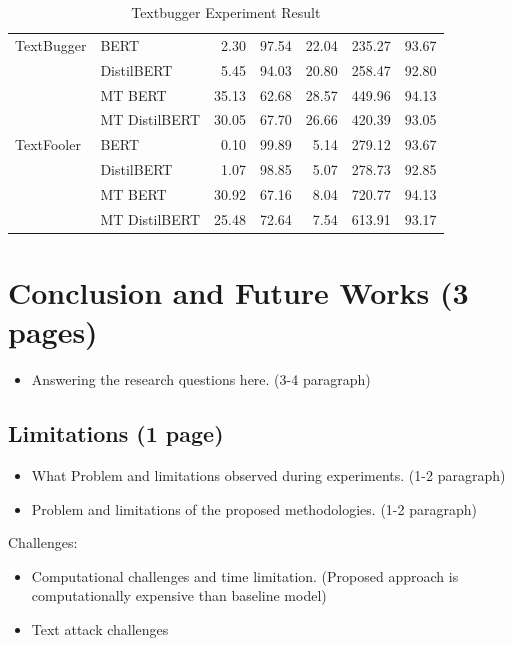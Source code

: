 \documentclass[%
	BCOR=8mm, %
	DIV=12, 
	toc=bibliography, %
	toc=listof, %
	oneside, %
	egregdoesnotlikesansseriftitles, %
	]{scrbook}
\begin{document}
\begin{table}
{\begin{tabular}{llrrrrr}
  \hline
TextBugger & BERT &                2.30 &               97.54 &                22.04 &             235.27 &         93.67 \\
           & DistilBERT &                5.45 &               94.03 &                20.80 &             258.47 &         92.80 \\
           & MT BERT &               35.13 &               62.68 &                28.57 &             449.96 &         94.13 \\
           & MT DistilBERT &               30.05 &               67.70 &                26.66 &             420.39 &         93.05 \\
   \hline
TextFooler & BERT &                0.10 &               99.89 &                 5.14 &             279.12 &         93.67 \\
           & DistilBERT &                1.07 &               98.85 &                 5.07 &             278.73 &         92.85 \\
           & MT BERT &               30.92 &               67.16 &                 8.04 &             720.77 &         94.13 \\
           & MT DistilBERT &               25.48 &               72.64 &                 7.54 &             613.91 &         93.17 \\
 
\bottomrule
\end{tabular}
}
\caption[Experiment Result]{Textbugger Experiment Result }
\label{table:exampleTable}
\end{table}

\chapter{Conclusion and Future Works (3 pages)}
\begin{itemize}
\item Answering the research questions here. (3-4 paragraph)
\end{itemize}

\section{Limitations (1 page)}
\begin{itemize}
\item What Problem and limitations observed during experiments. (1-2 paragraph)
\item Problem and limitations of the proposed methodologies. (1-2 paragraph)
\end{itemize}
Challenges:
\begin{itemize}
\item Computational challenges and time limitation. (Proposed approach is computationally expensive than baseline model)
\item Text attack challenges
\end{itemize}
\end{document}
